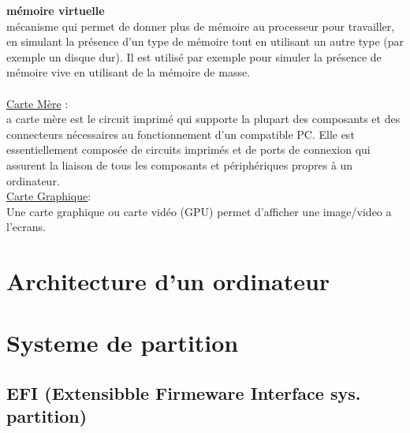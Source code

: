 \documentclass[a4paper,12pt,openany]{book}
\begin{document}
\textbf{mémoire virtuelle}\\
mécanisme qui permet de donner plus de mémoire au processeur pour travailler, en simulant la présence d'un type de mémoire tout en utilisant un autre type (par exemple un disque dur). Il est utilisé par exemple pour simuler la présence de mémoire vive en utilisant de la mémoire de masse.\\
\\
\underline{Carte Mère} :\\
a carte mère est le circuit imprimé qui supporte la plupart des composants et des connecteurs nécessaires au fonctionnement d'un compatible PC. Elle est essentiellement composée de circuits imprimés et de ports de connexion qui assurent la liaison de tous les composants et périphériques propres à un ordinateur.\\

\underline{Carte Graphique}:\\
Une carte graphique ou carte vidéo (GPU) permet d'afficher une image/video a l'ecrans.

\chapter{Architecture d'un ordinateur}

\chapter{Systeme de partition}

\section{EFI (Extensibble Firmeware Interface sys. partition)}
\end{document}
